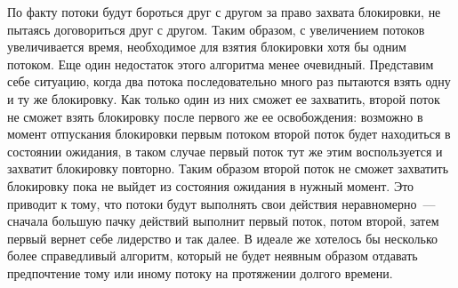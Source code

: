 По факту потоки будут бороться друг с другом за право захвата блокировки, не пытаясь договориться друг с другом. Таким образом, с увеличением потоков увеличивается время, необходимое для взятия блокировки хотя бы одним потоком. Еще один недостаток этого алгоритма менее очевидный. Представим себе ситуацию, когда два потока последовательно много раз пытаются взять одну и ту же блокировку. Как только один из них сможет ее захватить, второй поток не сможет взять блокировку после первого же ее освобождения: возможно в момент отпускания блокировки первым потоком второй поток будет находиться в состоянии ожидания, в таком случае первый поток тут же этим воспользуется и захватит блокировку повторно. Таким образом второй поток не сможет захватить блокировку пока не выйдет из состояния ожидания в нужный момент. Это приводит к тому, что потоки будут выполнять свои действия неравномерно~--- сначала большую пачку действий выполнит первый поток, потом второй, затем первый вернет себе лидерство и так далее. В идеале же хотелось бы несколько более справедливый алгоритм, который не будет неявным образом отдавать предпочтение тому или иному потоку на протяжении долгого времени.